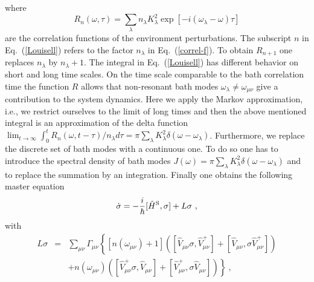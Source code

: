 \documentclass[12pt,twoside,a4paper]{report}
\begin{document}
where 
\begin{equation}
R
 _n
 (\omega,
  \tau)
            = 
               \sum_\lambda 
                   n_\lambda
                   K_\lambda^2
                   \exp{[-i
                          (\omega_\lambda-\omega)
                          \tau]}
\label{correl-f}
\end{equation}
are the correlation functions of the environment perturbations.  
The subscript $n$ in Eq.~(\ref{Louisell}) refers to the factor 
$n_\lambda$ in Eq.~(\ref{correl-f}).
To obtain $R_{n+1}$ one replaces $n_\lambda$ by $n_\lambda + 1$.
The integral in Eq.~(\ref{Louisell})
has different behavior on short and long time scales.  On
the time scale comparable to the bath correlation time the function
$R$ allows that non-resonant bath modes 
$\omega_\lambda \ne
\omega_{\mu \nu}$
give a contribution to the system dynamics.
Here we apply the Markov approximation, i.e., we restrict ourselves to
the limit of long times and then the above mentioned integral is an
approximation of the delta function
$
\lim
 _{t 
    \to 
   \infty}
 \int_0^t
 R_n
  (\omega,
   t-\tau)
/
 n
 _{\lambda}
 d\tau
            = 
               \pi
               \sum_\lambda
               K_\lambda^2 
               \delta(\omega-\omega_\lambda)$.  
Furthermore, we replace
the discrete set of bath modes with a continuous one.  To do so one
has to introduce the spectral density of bath modes
$J
 (\omega)
          =
 \pi
 \sum_\lambda 
     K_\lambda^2 
     \delta(\omega-\omega_\lambda)$
and to replace the summation by an integration.
Finally one obtains the following master equation
\begin{eqnarray}
  \label{7}
\dot 
\sigma
       =
          -
            \frac{i}{\hbar}
            [\hat H^{\rm S}, \sigma] 
          + L\sigma~,
\end{eqnarray}
with
\begin{eqnarray}
  \label{RWA_operator}
 L \sigma 
   &=&   \sum_{\mu{}\nu}
             \Gamma_{\mu{}\nu} 
             \left\{ 
                 \left[
                    n \left(
                        \omega_{\mu \nu}
                      \right)+1
                 \right]
                 (  [\hat V_{\mu{}\nu} \sigma,
                     \hat V^+_{\mu{}\nu}]
                  + [\hat V_{\mu{}\nu}, 
                    \sigma \hat V^+_{\mu{}\nu}]  ) 
             \right.
\\ \nonumber && +
             \left.
                 n(\omega_{\mu \nu})
                 (  [\hat V^+_{\mu{}\nu} \sigma, 
                     \hat V_{\mu \nu}]
                  + [\hat V^+_{\mu{}\nu}, 
                     \sigma \hat V_{\mu{}\nu}]    )
             \right\}~, 
\end{eqnarray}
\end{document}
